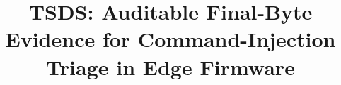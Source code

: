 \documentclass[10pt,conference]{IEEEtran}
\begin{document}
\title{TSDS: Auditable Final-Byte Evidence for Command-Injection Triage in Edge Firmware}


\maketitle











%


\let\oldthebibliography\thebibliography
\let\endoldthebibliography\endthebibliography
\renewenvironment{thebibliography}[1]{
  \begin{oldthebibliography}{#1}
    \setlength{\itemsep}{-2.2pt plus 0.1pt}
    \setlength{\parskip}{0pt}
}{
  \end{oldthebibliography}
}

\end{document}
